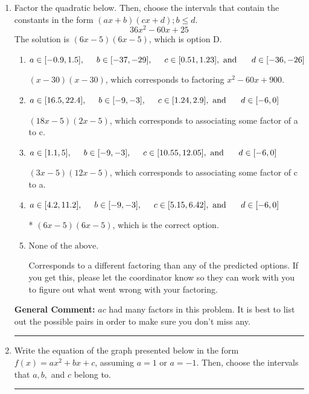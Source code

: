 \documentclass{extbook}[14pt]
\newcommand{\litem}[1]{\item #1

\rule{\textwidth}{0.4pt}}
\begin{document}
\begin{enumerate}\litem{
Factor the quadratic below. Then, choose the intervals that contain the constants in the form $(ax+b)(cx+d); b \leq d.$
\[ 36x^{2} -60 x + 25 \]The solution is \( (6x -5)(6x -5) \), which is option D.\begin{enumerate}[label=\Alph*.]
\item \( a \in [-0.9, 1.5], \hspace*{5mm} b \in [-37, -29], \hspace*{5mm} c \in [0.51, 1.23], \text{ and } \hspace*{5mm} d \in [-36, -26] \)

 $(x -30)(x -30)$, which corresponds to factoring $x^{2} -60 x + 900$.
\item \( a \in [16.5, 22.4], \hspace*{5mm} b \in [-9, -3], \hspace*{5mm} c \in [1.24, 2.9], \text{ and } \hspace*{5mm} d \in [-6, 0] \)

 $(18x -5)(2x -5)$, which corresponds to associating some factor of a to c.
\item \( a \in [1.1, 5], \hspace*{5mm} b \in [-9, -3], \hspace*{5mm} c \in [10.55, 12.05], \text{ and } \hspace*{5mm} d \in [-6, 0] \)

 $(3x -5)(12x -5)$, which corresponds to associating some factor of c to a.
\item \( a \in [4.2, 11.2], \hspace*{5mm} b \in [-9, -3], \hspace*{5mm} c \in [5.15, 6.42], \text{ and } \hspace*{5mm} d \in [-6, 0] \)

* $(6x -5)(6x -5)$, which is the correct option.
\item \( \text{None of the above.} \)

 Corresponds to a different factoring than any of the predicted options. If you get this, please let the coordinator know so they can work with you to figure out what went wrong with your factoring.
\end{enumerate}

\textbf{General Comment:} $ac$ had many factors in this problem. It is best to list out the possible pairs in order to make sure you don't miss any.
}
\litem{
Write the equation of the graph presented below in the form $f(x)=ax^2+bx+c$, assuming  $a=1$ or $a=-1$. Then, choose the intervals that $a, b,$ and $c$ belong to.

}
\end{enumerate}
\end{document}
